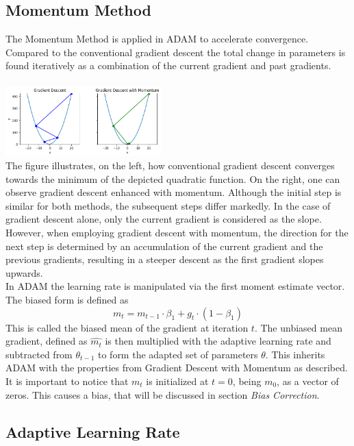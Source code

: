 \documentclass[journal]{IEEEtran}
\begin{document}
\subsection{Momentum Method}
The Momentum Method is applied in ADAM to accelerate convergence. Compared to the conventional gradient descent the total change in parameters is found iteratively as a combination of the current gradient and past gradients. \\\\
\includegraphics[width=0.45\textwidth]{report/figures/GD_momentum.png}\\
The figure illustrates, on the left, how conventional gradient descent converges towards the minimum of the depicted quadratic function. On the right, one can observe gradient descent enhanced with momentum. Although the initial step is similar for both methods, the subsequent steps differ markedly. In the case of gradient descent alone, only the current gradient is considered as the slope. However, when employing gradient descent with momentum, the direction for the next step is determined by an accumulation of the current gradient and the previous gradients, resulting in a steeper descent as the first gradient slopes upwards.\\
In ADAM the learning rate is manipulated via the first moment estimate vector. The biased form is defined as 
$$m_t=m_{t-1}\cdot \beta_1 + g_t\cdot (1-\beta_1)$$
This is called the biased mean of the gradient at iteration $t$. The unbiased mean gradient, defined as $\hat{m_t}$ is then multiplied with the adaptive learning rate and subtracted from $\theta_{t-1}$ to form the adapted set of parameters $\theta$. This inherits ADAM with the properties from Gradient Descent with Momentum as described.\\
It is important to notice that $m_t$ is initialized at $t=0$, being $m_0$, as a vector of zeros. This causes a bias, that will be discussed in section \textit{Bias Correction}.


\subsection{Adaptive Learning Rate}
\end{document}
